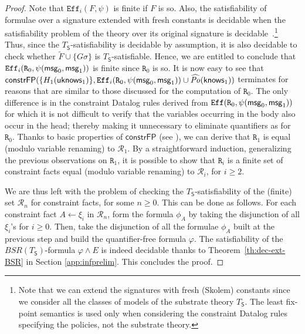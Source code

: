 \documentclass[conference]{llncs}
\newcommand{\know}{\ensuremath \mathsf{knows}}
\newcommand{\msg}{\ensuremath \mathsf{msg}}
\newcommand{\knowzero}{\ensuremath \mathsf{uknows}}
\begin{document}
{\begin{proof}
  Note that $\mathtt{Eff}_i(F,\psi)$ is finite if $F$
  is so.  Also, the satisfiability of formulae over a signature
  extended with fresh constants is decidable when the satisfiability
  problem of the theory over its original signature is
  decidable~\cite{TinelliZarba}.\footnote{Note that we can extend
    the signatures with fresh (Skolem) constants since we consider all
    the classes of models of the substrate theory $T_{\mathsf{S}}$.
    The least fix-point semantics is used only when considering the
    constraint Datalog rules specifying the policies, not the
    substrate theory.}  Thus, since the
  $T_{\mathsf{S}}$-satisfiability is decidable by assumption, it is
  also decidable to check whether $\tilde{F}\cup \{G\sigma\}$ is
  $T_{\mathsf{S}}$-satisfiable. Hence, we are entitled to conclude
  that $\mathtt{Eff}_i(\mathtt{R}_0,\psi(\msg_0,\msg_1))$ is finite
  since $\mathtt{R}_0$ is so. It is now easy to see that
  $\mathsf{constrFP}(\{H_1(\knowzero_1)\},
  \mathtt{Eff}_i(\mathtt{R}_0,\psi(\msg_0,\msg_1))\cup
  \widehat{\mathit{Po}}(\know_1))$ terminates for reasons that are
  similar to those discussed for the computation of $\mathtt{R}_0$.
  The only difference is in the constraint Datalog rules derived from
  $\mathtt{Eff}(\mathtt{R}_0,\psi(\msg_0,\msg_1))$ for which it is not
  difficult to verify that the variables occurring in the body also
  occur in the head; thereby making it unnecessary to eliminate
  quantifiers as for $\mathtt{R}_0$. Thanks to basic properties of
  $\mathsf{constrFP}$ (see \cite{constraintdatalog}), we can derive that $\mathtt{R}_1$ is equal
  (modulo variable renaming) to $\mathcal{R}_1$.  By a straightforward
  induction, generalizing the previous observations on $\mathtt{R}_1$,
  it is possible to show that $\mathtt{R}_i$ is a finite set of
  constraint facts equal (modulo variable renaming) to
  $\mathcal{R}_i$, for $i\geq 2$.

  We are thus left with the problem of checking the
  $T_{\mathsf{S}}$-satisfiability of the (finite) set $\mathcal{R}_n$
  for constraint facts, for some $n\geq 0$.  This can be done as
  follows.  For each constraint fact $A \leftarrow \xi_i$ in
  $\mathcal{R}_n$, form the formula $\phi_A$ by taking the disjunction
  of all $\xi_i$'s for $i\geq 0$.  Then, take the disjunction of all
  the formulae $\phi_A$ built at the previous step and build the
  quantifier-free formula $\varphi$.  The satisfiability of the
  $\mathit{BSR}(T_{\mathsf{S}})$-formula $\varphi\wedge E$ is indeed decidable
  thanks to Theorem~\ref{th:dec-ext-BSR} in Section \ref{app:infprelim}. This concludes the proof.  
\end{proof}



}
\end{document}
